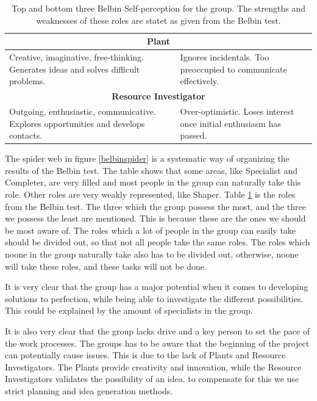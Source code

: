 \begin{table}[ht]
\begin{tabular}{|p{}|p{}|}
\multicolumn{2}{|c|}{\textbf{Plant}}                                                                                                                                             \\ \hline
Creative, imaginative, free-thinking. Generates ideas and solves difficult problems.              & Ignores incidentals. Too preoccupied to communicate effectively.             \\ \hline
\multicolumn{2}{|c|}{\textbf{Resource Investigator}}                                                                                                                             \\ \hline
Outgoing, enthusiastic, communicative. Explores opportunities and develops contacts.              & Over-optimistic. Loses interest once initial enthusiasm has passed.          \\ \hline
\end{tabular}
\caption[Top and bottom three Belbin Self-perception for the group.]{Top and bottom three Belbin Self-perception for the group. The strengths and weaknesses of these roles are statet as given from the Belbin test.}
\label{belbintable}
\end{table}


The spider web in figure \ref{belbinspider} is a systematic way of organizing the results of the Belbin test. The table shows that some areas, like Specialist and Completer, are very filled and most people in the group can naturally take this role. Other roles are very weakly represented, like Shaper. 
Table \ref{belbintable} is the roles from the Belbin test. The three which the group possess the most, and the three we possess the least are mentioned. This is because these are the ones we should be most aware of. 
The roles which a lot of people in the group can easily take should be divided out, so that not all people take the same roles. The roles which noone in the group naturally take also has to be divided out, otherwise, noone will take these roles, and these tasks will not be done. 


It is very clear that the group has a major potential when it comes to developing solutions to perfection, while being able to investigate the different possibilities. 
This could be explained by the amount of specialists in the group.

It is also very clear that the group lacks drive and a key person to set the pace of the work processes. 
The groups has to be aware that the beginning of the project can potentially cause issues. 
This is due to the lack of Plants and Resource Investigators. 
The Plants provide creativity and innovation, while the Resource Investigators validates the possibility of an idea. to compensate for this we use strict planning and idea generation methods.


